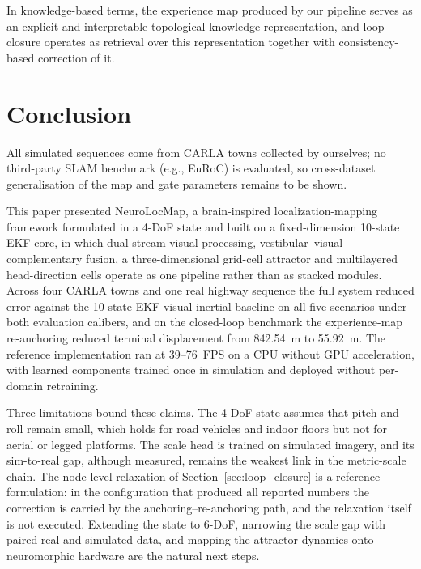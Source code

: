 \documentclass[review,12pt]{elsarticle}
\begin{document}
In knowledge-based terms, the experience map produced by our pipeline serves as an explicit and interpretable topological knowledge representation, and loop closure operates as retrieval over this representation together with consistency-based correction of it.











\section{Conclusion}
\label{sec:conclusion}

All simulated sequences come from CARLA towns collected by ourselves; no third-party SLAM benchmark (e.g., EuRoC) is evaluated, so cross-dataset generalisation of the map and gate parameters remains to be shown.

This paper presented NeuroLocMap, a brain-inspired localization-mapping framework formulated in a 4-DoF state and built on a fixed-dimension 10-state EKF core, in which dual-stream visual processing, vestibular--visual complementary fusion, a three-dimensional grid-cell attractor and multilayered head-direction cells operate as one pipeline rather than as stacked modules. Across four CARLA towns and one real highway sequence the full system reduced error against the 10-state EKF visual-inertial baseline on all five scenarios under both evaluation calibers, and on the closed-loop benchmark the experience-map re-anchoring reduced terminal displacement from 842.54~m to 55.92~m. The reference implementation ran at 39--76~FPS on a CPU without GPU acceleration, with learned components trained once in simulation and deployed without per-domain retraining.

Three limitations bound these claims. The 4-DoF state assumes that pitch and roll remain small, which holds for road vehicles and indoor floors but not for aerial or legged platforms. The scale head is trained on simulated imagery, and its sim-to-real gap, although measured, remains the weakest link in the metric-scale chain. The node-level relaxation of Section~\ref{sec:loop_closure} is a reference formulation: in the configuration that produced all reported numbers the correction is carried by the anchoring--re-anchoring path, and the relaxation itself is not executed. Extending the state to 6-DoF, narrowing the scale gap with paired real and simulated data, and mapping the attractor dynamics onto neuromorphic hardware are the natural next steps.
\end{document}
